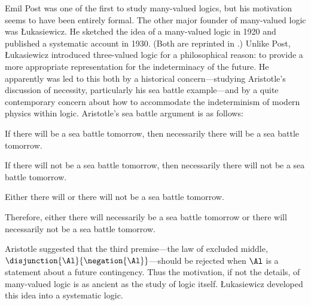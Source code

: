 Emil Post was one of the first to study many-valued logics, but his motivation seems to have been entirely formal. 
The other major founder of many-valued logic was \L{}ukasiewicz. 
He sketched the idea of a many-valued logic in 1920 and published a systematic account in 1930. 
(Both are reprinted in \citealp{Borkowski1970}.) 
Unlike Post, \L{}ukasiewicz introduced three-valued logic for a philosophical reason: to provide a more appropriate representation for the indeterminacy of the future. 
He apparently was led to this both by a historical concern---studying Aristotle's discussion of necessity, particularly
his sea battle example---and by a quite contemporary concern about how to accommodate the indeterminism of modern physics within logic. 
Aristotle's sea battle argument is as follows: 
\begin{cenumerate} 
	\item If there will be a sea battle tomorrow, then necessarily there will be a sea battle tomorrow.
	\item If there will not be a sea battle tomorrow, then necessarily there will not be a sea battle tomorrow.
	\item Either there will or there will not be a sea battle tomorrow.
	\item Therefore, either there will necessarily be a sea battle tomorrow or there will necessarily not be a sea battle tomorrow.
\end{cenumerate}
Aristotle suggested that the third premise---the law of excluded middle, $\disjunction{\Al}{\negation{\Al}}$---should be rejected when $\Al$ is a statement about a future contingency. 
Thus the motivation, if not the details, of many-valued logic is as ancient as the study of logic itself. 
\L{}ukasiewicz developed this idea into a systematic logic. 

